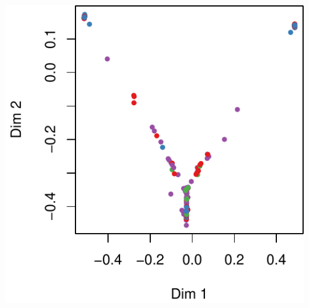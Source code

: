 \documentclass[]{article}
\begin{document}
\includegraphics{markdown_v50_files/figure-latex/unnamed-chunk-107-1.pdf}
\end{document}
